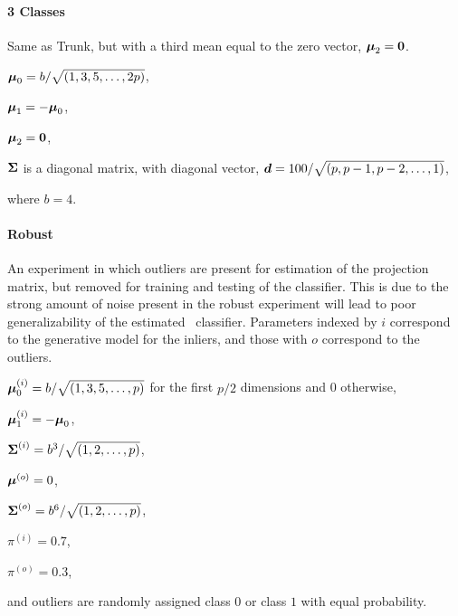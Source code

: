 \documentclass[11pt]{extarticle}
\begin{document}
%
%
%
%


\paragraph*{3 Classes} Same as Trunk, but with a third mean equal to the zero vector, $\boldsymbol{\mu}_2=\boldsymbol{0}$.
\begin{compactitem}
\item $\boldsymbol{\mu}_0=b/\sqrt{(1, 3, 5, \ldots, 2p)}$,
\item $\boldsymbol{\mu}_1=-\boldsymbol{\mu}_0$,
\item $\boldsymbol{\mu}_2 = \boldsymbol{0}$,
\item $\boldsymbol{\Sigma}$ is a diagonal matrix, with diagonal vector, $\boldsymbol{d}=100/\sqrt{(p, p-1, p-2, \ldots, 1)}$,
\end{compactitem}
where $b=4$.



\paragraph*{Robust}
An experiment in which outliers are present for estimation of the projection matrix, but removed for training and testing of the classifier. This is due to the strong amount of noise present in the robust experiment will lead to poor generalizability of the estimated \Lda~classifier. Parameters indexed by $i$ correspond to the generative model for the inliers, and those with $o$ correspond to the outliers.
\begin{compactitem}
\item $\boldsymbol{\mu}_0^{(i)}=b/\sqrt{(1, 3, 5, \hdots, p)}$ for the first $p/2$ dimensions and 0 otherwise,
\item $\boldsymbol{\mu}_1^{(i)}=-\boldsymbol{\mu}_0$,
\item $\boldsymbol{\Sigma}^{(i)}=b^3/\sqrt{(1, 2, \hdots, p)}$,
\item $\boldsymbol{\mu}^{(o)}=0$,
\item $\boldsymbol{\Sigma}^{(o)}=b^6/\sqrt{(1, 2, \hdots, p)}$,
\item $\pi^{(i)} = 0.7$,
\item $\pi^{(o)} = 0.3$,
\end{compactitem}
and outliers are randomly assigned class $0$ or class $1$ with equal probability.
\end{document}

